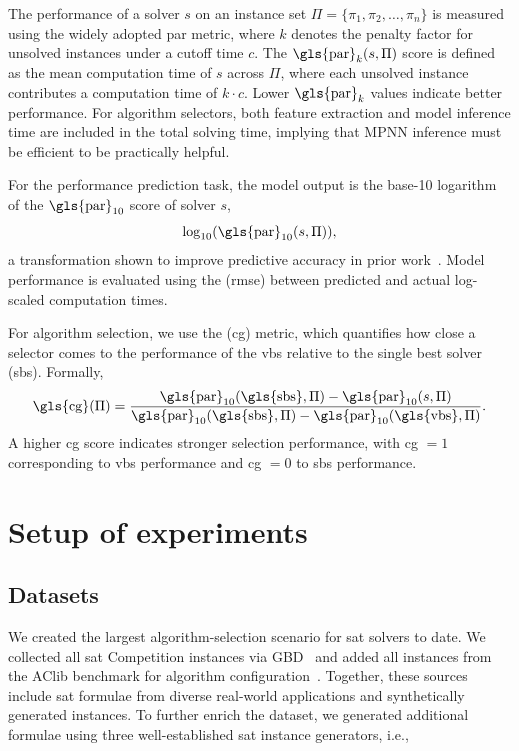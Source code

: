 The performance of a solver $s$ on an instance set $\Pi=\{\pi_1, \pi_2, \dots, \pi_n\}$ is measured using the widely adopted \gls{par} metric, where $k$ denotes the penalty factor for unsolved instances under a cutoff time $c$. The $\text{\gls{par}}_k(s, \Pi)$ score is defined as the mean computation time of $s$ across $\Pi$, where each unsolved instance contributes a computation time of $k \cdot c$. Lower $\text{\gls{par}}_k$ values indicate better performance. For algorithm selectors, both feature extraction and model inference time are included in the total solving time, implying that MPNN inference must be efficient to be practically helpful.

For the performance prediction task, the model output is the base-10 logarithm of the $\text{\gls{par}}_{10}$ score of solver $s$,
\begin{equation*}
	\log_{10}(\text{\gls{par}}_{10}(s, \Pi)),
\end{equation*}
a transformation shown to improve predictive accuracy in prior work~\citep{HutEtAl14c}. Model performance is evaluated using the  (\gls{rmse}) between predicted and actual log-scaled computation times.

For algorithm selection, we use the  (\gls{cg}) metric, which quantifies how close a selector comes to the performance of the \gls{vbs} relative to the single best solver (\gls{sbs}). Formally,
\begin{equation*}
	\text{\gls{cg}}(\Pi) = \frac{\text{\gls{par}}_{10}(\text{\gls{sbs}}, \Pi) - \text{\gls{par}}_{10}(s, \Pi)}{\text{\gls{par}}_{10}(\text{\gls{sbs}}, \Pi) - \text{\gls{par}}_{10}(\text{\gls{vbs}}, \Pi)}.
\end{equation*}
A higher \gls{cg} score indicates stronger selection performance, with \gls{cg} $=1$ corresponding to \gls{vbs} performance and \gls{cg} $=0$ to \gls{sbs} performance.

\section{Setup of experiments}

\subsection{Datasets}
We created the largest algorithm-selection scenario for \gls{sat} solvers to date. We collected all \gls{sat} Competition instances via GBD~\citep{IseJab24} and added all instances from the AClib benchmark for algorithm configuration~\citep{HutEtAl14d}. Together, these sources include \gls{sat} formulae from diverse real-world applications and synthetically generated instances. To further enrich the dataset, we generated additional formulae using three well-established \gls{sat} instance generators, i.e.,

